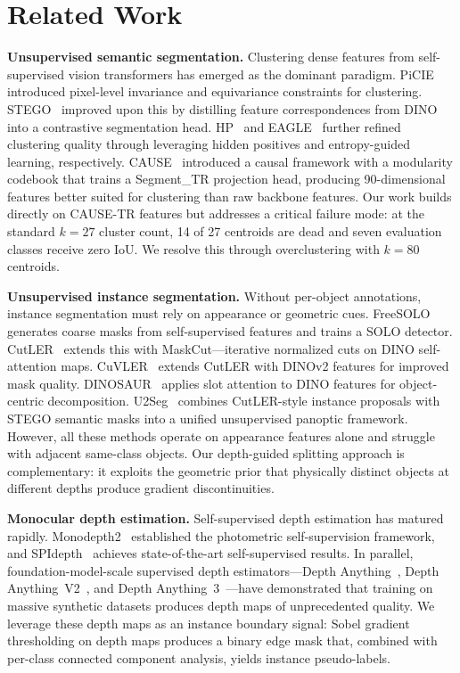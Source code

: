 \documentclass{bmvc2k}
\begin{document}
\section{Related Work}
\label{sec:related}

\noindent\textbf{Unsupervised semantic segmentation.}
Clustering dense features from self-supervised vision transformers has emerged as the dominant paradigm. PiCIE~\cite{cho2021picie} introduced pixel-level invariance and equivariance constraints for clustering. STEGO~\cite{hamilton2022stego} improved upon this by distilling feature correspondences from DINO~\cite{caron2021dino} into a contrastive segmentation head. HP~\cite{seong2023hp} and EAGLE~\cite{kim2024eagle} further refined clustering quality through leveraging hidden positives and entropy-guided learning, respectively. CAUSE~\cite{kim2025cause} introduced a causal framework with a modularity codebook that trains a Segment\_TR projection head, producing 90-dimensional features better suited for clustering than raw backbone features. Our work builds directly on CAUSE-TR features but addresses a critical failure mode: at the standard $k{=}27$ cluster count, 14 of 27 centroids are dead and seven evaluation classes receive zero IoU. We resolve this through overclustering with $k{=}80$ centroids.

\noindent\textbf{Unsupervised instance segmentation.}
Without per-object annotations, instance segmentation must rely on appearance or geometric cues. FreeSOLO~\cite{wang2022freesolo} generates coarse masks from self-supervised features and trains a SOLO detector. CutLER~\cite{wang2023cutler} extends this with MaskCut---iterative normalized cuts on DINO self-attention maps. CuVLER~\cite{arica2024cuvler} extends CutLER with DINOv2 features for improved mask quality. DINOSAUR~\cite{seitzer2023dinosaur} applies slot attention to DINO features for object-centric decomposition. U2Seg~\cite{niu2024u2seg} combines CutLER-style instance proposals with STEGO semantic masks into a unified unsupervised panoptic framework. However, all these methods operate on appearance features alone and struggle with adjacent same-class objects. Our depth-guided splitting approach is complementary: it exploits the geometric prior that physically distinct objects at different depths produce gradient discontinuities.

\noindent\textbf{Monocular depth estimation.}
Self-supervised depth estimation has matured rapidly. Monodepth2~\cite{godard2019monodepth2} established the photometric self-supervision framework, and SPIdepth~\cite{lavreniuk2025spidepth} achieves state-of-the-art self-supervised results. In parallel, foundation-model-scale supervised depth estimators---Depth Anything~\cite{yang2024da1}, Depth Anything~V2~\cite{yang2024da2}, and Depth Anything~3~\cite{lin2025da3}---have demonstrated that training on massive synthetic datasets produces depth maps of unprecedented quality. We leverage these depth maps as an instance boundary signal: Sobel gradient thresholding on depth maps produces a binary edge mask that, combined with per-class connected component analysis, yields instance pseudo-labels.
\end{document}
